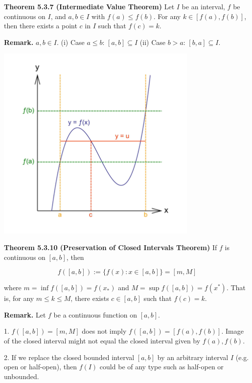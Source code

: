 \documentclass[10pt,landscape]{article}
\begin{document}
\begin{multicols}{4}
\textbf{Theorem 5.3.7 (Intermediate Value Theorem)} Let $I$ be an interval, $f$ be continuous on $I$, and $a, b \in I$ with $f(a) \leq f(b)$. For any $k \in [f(a), f(b)]$, then there exists a point $c$ in $I$ such that $f(c) = k$. 

\textbf{Remark.} $a, b \in I$. (i) Case $a \leq b$: $[a, b] \subseteq I$ (ii) Case $b > a$: $[b, a] \subseteq I$.

\includegraphics[width=\columnwidth]{images/intermediate-value-theorem.png}

\textbf{Theorem 5.3.10 (Preservation of Closed Intervals Theorem)} If $f$ is continuous on $[a ,b]$, then 

$$
f([a, b]) := \{ f(x) : x \in [a, b] \} = [m, M]
$$

where $m = \inf f([a, b]) = f(x_*)$ and $M = \sup f([a, b]) = f(x^*)$. That is, for any $m \leq k \leq M$, there exists $c \in [a, b]$ such that $f(c) = k$.

\textbf{Remark.} Let $f$ be a continuous function on $[a, b]$.

1. $f([a, b]) = [m, M]$ does not imply $f([a, b]) = [f(a), f(b)]$. Image of the closed interval might not equal the closed interval given by $f(a), f(b)$.

2. If we replace the closed bounded interval $[a, b]$ by an arbitrary interval $I$ (e.g. open or half-open), then $f(I)$ could be of any type such as half-open or unbounded.


\end{multicols}
\end{document}
